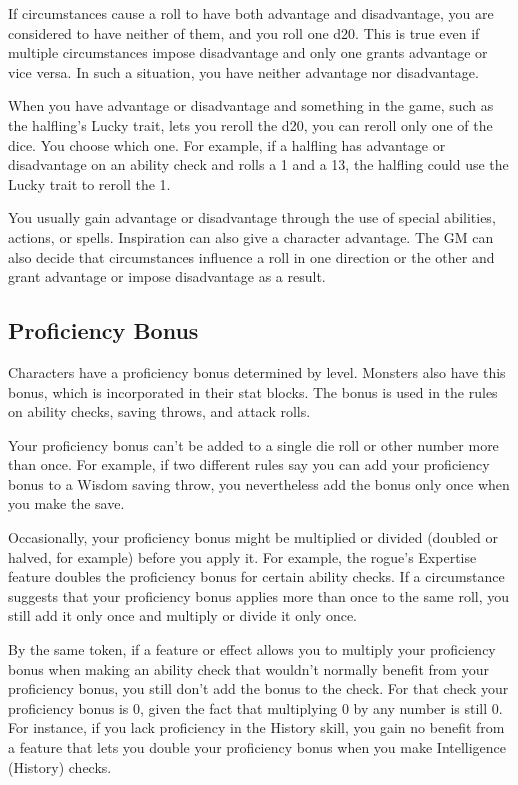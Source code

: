 \documentclass[
]{article}
\begin{document}
If circumstances cause a roll to have both advantage and disadvantage,
you are considered to have neither of them, and you roll one d20. This
is true even if multiple circumstances impose disadvantage and only one
grants advantage or vice versa. In such a situation, you have neither
advantage nor disadvantage.

When you have advantage or disadvantage and something in the game, such
as the halfling's Lucky trait, lets you reroll the d20, you can reroll
only one of the dice. You choose which one. For example, if a halfling
has advantage or disadvantage on an ability check and rolls a 1 and a
13, the halfling could use the Lucky trait to reroll the 1.

You usually gain advantage or disadvantage through the use of special
abilities, actions, or spells. Inspiration can also give a character
advantage. The GM can also decide that circumstances influence a roll in
one direction or the other and grant advantage or impose disadvantage as
a result.

\hypertarget{proficiency-bonus}{%
\subsection{Proficiency Bonus}\label{proficiency-bonus}}

Characters have a proficiency bonus determined by level. Monsters also
have this bonus, which is incorporated in their stat blocks. The bonus
is used in the rules on ability checks, saving throws, and attack rolls.

Your proficiency bonus can't be added to a single die roll or other
number more than once. For example, if two different rules say you can
add your proficiency bonus to a Wisdom saving throw, you nevertheless
add the bonus only once when you make the save.

Occasionally, your proficiency bonus might be multiplied or divided
(doubled or halved, for example) before you apply it. For example, the
rogue's Expertise feature doubles the proficiency bonus for certain
ability checks. If a circumstance suggests that your proficiency bonus
applies more than once to the same roll, you still add it only once and
multiply or divide it only once.

By the same token, if a feature or effect allows you to multiply your
proficiency bonus when making an ability check that wouldn't normally
benefit from your proficiency bonus, you still don't add the bonus to
the check. For that check your proficiency bonus is 0, given the fact
that multiplying 0 by any number is still 0. For instance, if you lack
proficiency in the History skill, you gain no benefit from a feature
that lets you double your proficiency bonus when you make Intelligence
(History) checks.
\end{document}

